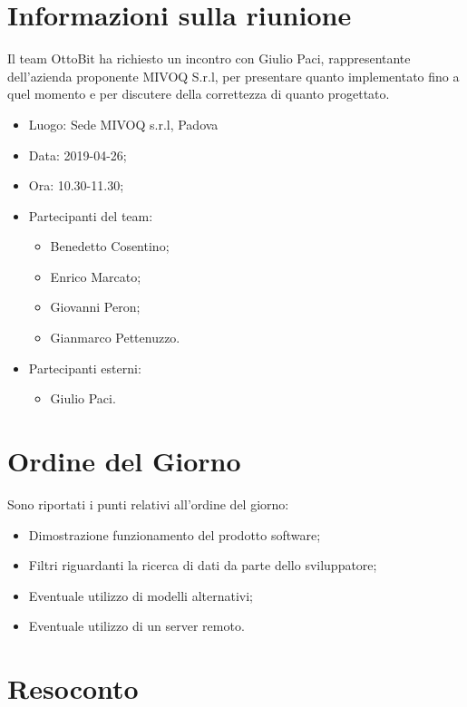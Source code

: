 \documentclass[11pt,a4paper]{article}
\begin{document}
	\section{Informazioni sulla riunione}
	Il team OttoBit ha richiesto un incontro con Giulio Paci, rappresentante dell'azienda proponente MIVOQ S.r.l, per presentare quanto implementato fino a quel momento e per discutere della correttezza di quanto progettato.
	\begin{itemize}
		\item Luogo: Sede MIVOQ s.r.l, Padova
		\item Data: 2019-04-26;
		\item Ora: 10.30-11.30;
		\item Partecipanti del team:
		\begin{itemize}
			\item Benedetto Cosentino;
			\item Enrico Marcato;
			\item Giovanni Peron;
			\item Gianmarco Pettenuzzo.
			
		\end{itemize}
	\item Partecipanti esterni:
	\begin{itemize}
		\item Giulio Paci.
	\end{itemize}
	\end{itemize}
	
	\section{Ordine del Giorno}
	Sono riportati i punti relativi all'ordine del giorno:
	\begin{itemize}
		\item Dimostrazione funzionamento del prodotto software;
		\item Filtri riguardanti la ricerca di dati da parte dello sviluppatore;
		\item Eventuale utilizzo di modelli alternativi;
		\item Eventuale utilizzo di un server remoto.
	\end{itemize}
	
	\section{Resoconto}
\end{document}
